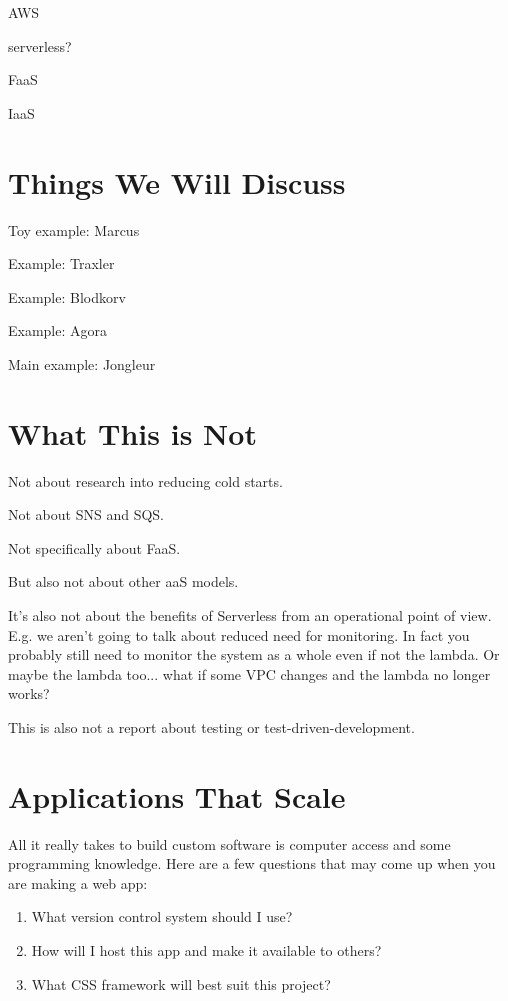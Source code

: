 \documentclass{article}
\begin{document}
AWS

serverless?

FaaS

IaaS

\section{Things We Will Discuss}

Toy example: Marcus

Example: Traxler

Example: Blodkorv

Example: Agora

Main example: Jongleur

\section{What This is Not}

Not about research into reducing cold starts.

Not about SNS and SQS.

Not specifically about FaaS.

But also not about other aaS models.

It's also not about the benefits of Serverless from an operational point of view.
E.g. we aren't going to talk about reduced need for monitoring.
In fact you probably still need to monitor the system as a whole even if not the lambda.
Or maybe the lambda too... what if some VPC changes and the lambda no longer works?

This is also not a report about testing or test-driven-development.

\section{Applications That Scale}

All it really takes to build custom software is computer access and some programming knowledge.
Here are a few questions that may come up when you are making a web app:

\begin{enumerate}
  \item What version control system should I use?
  \item How will I host this app and make it available to others?
  \item What CSS framework will best suit this project?
\end{enumerate}
\end{document}
